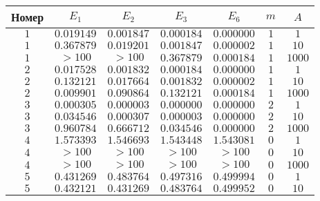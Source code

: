 \documentclass[14pt,a4paper]{extarticle}
\newcommand{\1}{\mathbbm{1}}
\begin{document}
\begin{table}[h!] 
    \begin{center} 
    \begin{tabular}{|c|c|c|c|c|c|c|} 
    \hline 
    Номер  & $E_1$ & $E_2$ & $E_3$ & $E_6$ & $m$ & $A$ \\ \hline
     $1$ &  $0.019149$ & $0.001847$ & $0.000184$ & $0.000000$ & $1$ & $1$ \\ \hline 
    
     $1$ &  $0.367879$ & $0.019201$ & $0.001847$ & $0.000002$ & $1$ & $10$ \\ \hline 
    
     $1$ &  $>100$ & $>100$ & $0.367879$ & $0.000184$ & $1$ & $1000$ \\ \hline 
    
     $2$ &  $0.017528$ & $0.001832$ & $0.000184$ & $0.000000$ & $1$ & $1$ \\ \hline 
    
     $2$ &  $0.132121$ & $0.017664$ & $0.001832$ & $0.000002$ & $1$ & $10$ \\ \hline 
    
     $2$ &  $0.009901$ & $0.090864$ & $0.132121$ & $0.000184$ & $1$ & $1000$ \\ \hline 
    
     $3$ &  $0.000305$ & $0.000003$ & $0.000000$ & $0.000000$ & $2$ & $1$ \\ \hline 
    
     $3$ &  $0.034546$ & $0.000307$ & $0.000003$ & $0.000000$ & $2$ & $10$ \\ \hline 
    
     $3$ &  $0.960784$ & $0.666712$ & $0.034546$ & $0.000000$ & $2$ & $1000$ \\ \hline 
    
     $4$ &  $1.573393$ & $1.546693$ & $1.543448$ & $1.543081$ & $0$ & $1$ \\ \hline 
    
     $4$ &  $>100$ & $>100$ & $>100$ & $>100$ & $0$ & $10$ \\ \hline 
    
     $4$ &  $>100$ & $>100$ & $>100$ & $>100$ & $0$ & $1000$ \\ \hline 
    
     $5$ &  $0.431269$ & $0.483764$ & $0.497316$ & $0.499994$ & $0$ & $1$ \\ \hline 
    
     $5$ &  $0.432121$ & $0.431269$ & $0.483764$ & $0.499952$ & $0$ & $10$ \\ \hline 
    

\end{tabular}
\end{center}
\end{table}
\end{document}
